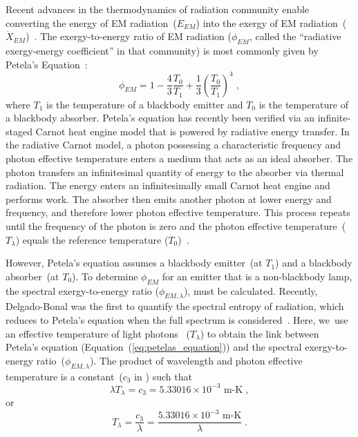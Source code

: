 \documentclass[energies,article,accept,moreauthors,pdftex]{Definitions/mdpi}\usepackage[]{graphicx}\usepackage[]{color}
\newcommand{\EM}{E \! M}
\begin{document}
Recent advances in the thermodynamics of radiation community
enable converting the energy of EM radiation~($\dot{E}_{EM}$)
into the exergy of EM radiation~($\dot{X}_{EM}$)~\cite{Shan2019}.
The exergy-to-energy ratio of EM radiation
($\phi_{\EM}$, called the ``radiative exergy-energy coefficient'' in that community)
is most commonly given by Petela's Equation~\cite{petela1964exergy, Delgado-Bonal:2017aa, Shan2019}:
\vspace{-12pt}
\begin{equation} \label{eq:petelas_equation}
 \phi_{\EM} = 1 - \frac{4}{3}\frac{T_{0}}{T_{1}} + \frac{1}{3} \left(\frac{T_{0}}{T_{1}}\right)^4 \; ,
\end{equation}
%
where $T_1$ is the temperature of a blackbody emitter and 
$T_0$ is the temperature of a blackbody absorber.
Petela's equation has recently been verified via an infinite-staged
Carnot heat engine model \cite{zhou2017exergy}
that is powered by radiative energy transfer.
In the radiative Carnot model, a photon possessing a characteristic frequency 
and photon effective temperature enters a medium that acts as an ideal absorber. 
The photon transfers an infinitesimal quantity of energy to the absorber via thermal radiation.
The energy enters an infinitesimally small Carnot heat engine and performs work. 
The absorber then emits another photon at lower energy and frequency,
and therefore lower photon effective temperature. 
This process repeats until the frequency of the photon is zero
and the photon effective temperature~($T_\lambda$)
equals the reference temperature ($T_0$)~\cite{Shan2019}.

However, Petela's equation assumes a blackbody emitter~(at $T_1$) and
a blackbody absorber~(at $T_0$).
To determine $\phi_{\EM}$ for an emitter that is a non-blackbody lamp,
the spectral exergy-to-energy ratio ($\phi_{\EM,\lambda}$),
must be calculated.
Recently, 
Delgado-Bonal
was the first to quantify
the spectral entropy of radiation, which 
reduces to Petela's equation when the full spectrum is considered~\citep{Delgado-Bonal:2017aa}.
Here, \mbox{we use} an effective temperature of light photons~\cite{chen2008} ($T_\lambda$) 
to obtain the link between Petela's equation (Equation~(\ref{eq:petelas_equation}))
and the spectral exergy-to-energy ratio~($\phi_{\EM,\lambda}$).
The product of wavelength and photon effective temperature 
is a constant~($c_3$ in \citet{chen2008}) such that
\begin{equation}
  \lambda T_{\lambda} = c_{3} = 5.33016 \times 10^{-3} \text{ m-K} \; ,
\end{equation}
%
or
\begin{equation} \label{eq:T_lambda}
  T_\lambda = \frac{c_3}{\lambda} = \frac{5.33016 \times 10^{-3} \text{ m-K}}{\lambda} \; .
\end{equation}
\end{document}
